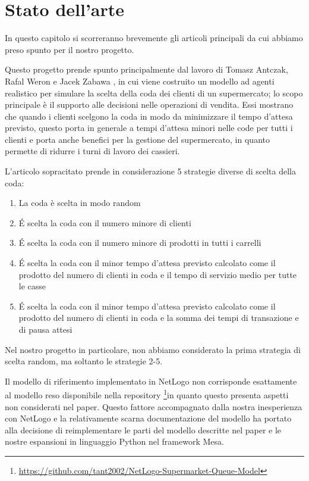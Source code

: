 \chapter{Stato dell'arte}
\label{chapter:sota}

In questo capitolo si scorreranno brevemente gli articoli principali da cui abbiamo preso spunto per il nostro progetto. 

\vspace*{1\baselineskip}

Questo progetto prende spunto principalmente dal lavoro di Tomasz Antczak, Rafal Weron e Jacek Zabawa \cite{article1}, in cui viene costruito un modello ad agenti realistico per simulare la scelta della coda dei clienti di un supermercato; lo scopo principale è il supporto alle decisioni nelle operazioni di vendita. Essi mostrano che quando i clienti scelgono la coda in modo da minimizzare il tempo d'attesa previsto, questo porta in generale a tempi d'attesa minori nelle code per tutti i clienti e porta anche benefici per la gestione del supermercato, in quanto permette di ridurre i turni di lavoro dei cassieri.

L'articolo sopracitato prende in considerazione 5 strategie diverse di scelta della coda:

\begin{enumerate}
	\item La coda è scelta in modo random
	\item \'E scelta la coda con il numero minore di clienti
	\item \'E scelta la coda con il numero minore di prodotti in tutti i carrelli
	\item \'E scelta la coda con il minor tempo d'attesa previsto calcolato come il prodotto del numero di clienti in coda e il tempo di servizio medio per tutte le casse
	\item \'E scelta la coda con il minor tempo d'attesa previsto calcolato come il prodotto del numero di clienti in coda e la somma dei tempi di transazione e di pausa attesi
\end{enumerate}

Nel nostro progetto in particolare, non abbiamo considerato la prima
strategia di scelta random, ma soltanto le strategie 2-5.

Il modello di riferimento \cite{article1} implementato in NetLogo non
corrisponde esattamente al modello reso disponibile nella repository
\footnote{\protect\url{https://github.com/tant2002/NetLogo-Supermarket-Queue-Model}}in
quanto questo presenta aspetti non considerati nel paper. Questo
fattore accompagnato dalla nostra inesperienza con NetLogo e la
relativamente scarna documentazione del modello ha portato alla
decisione di reimplementare le parti del modello descritte nel paper
\cite{article1} e le nostre espansioni in linguaggio Python nel
framework Mesa.

